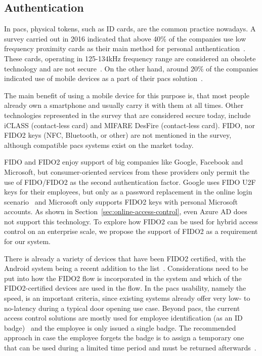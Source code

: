 \subsection{Authentication}\label{sec:analysis-authentication}
In \acrshort{pacs}, physical tokens, such as ID cards, are the common practice nowadays. A survey carried out in 2016 indicated that above 40\% of the companies use low frequency proximity cards as their main method for personal authentication~\cite{HIDGlobal2017TheEnterprise}. These cards, operating in 125-134kHz frequency range are considered an obsolete technology and are not secure~\cite{Hakamaki2015SecurityTechnology}. On the other hand, around 20\% of the companies indicated use of mobile devices as a part of their \acrshort{pacs} solution~\cite{HIDGlobal2017TheEnterprise}. 

The main benefit of using a mobile device for this purpose is, that most people already own a smartphone and usually carry it with them at all times. Other technologies represented in the survey that are considered secure today, include iCLASS (contact-less card) and MIFARE DesFire (contact-less card). FIDO, nor FIDO2 keys (NFC, Bluetooth, or other) are not mentioned in the survey, although compatible \acrshort{pacs} systems exist on the market today\footnotemark. 

FIDO and FIDO2 enjoy support of big companies like Google, Facebook and Microsoft, but consumer-oriented services from these providers only permit the use of FIDO/FIDO2 as the second authentication factor. Google uses FIDO U2F keys for their employees, but only as a password replacement in the online login scenario~\cite{Krebs2018Google:Phishing} and Microsoft only supports FIDO2 keys with personal Microsoft accounts. As shown in Section~\ref{sec:online-access-control}, even Azure AD does not support this technology. To explore how FIDO2 can be used for hybrid access control on an enterprise scale, we propose the support of FIDO2 as a requirement for our system.
% 

There is already a variety of devices that have been FIDO2 certified, with the Android system being a recent addition to the list~\cite{FIDOAlliance2019AndroidPasswords}. Considerations need to be put into how the FIDO2 flow is incorporated in the system and which of the FIDO2-certified devices are used in the flow. In the \acrshort{pacs} usability, namely the speed, is an important criteria, since existing systems already offer very low- to no-latency during a typical door opening use case. Beyond \acrshort{pacs}, the current access control solutions are mostly used for employee identification (as an ID badge)~\cite{HIDGlobal2017TheEnterprise} and the employee is only issued a single badge. The recommended approach in case the employee forgets the badge is to assign a temporary one that can be used during a limited time period and must be returned afterwards~\cite{Ryan2018HowBadges}.

